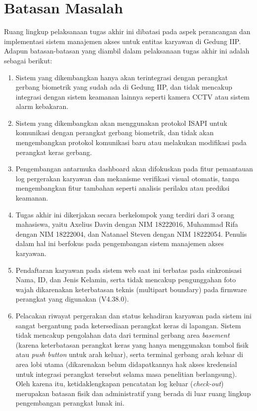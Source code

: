 \section{Batasan Masalah}
Ruang lingkup pelaksanaan tugas akhir ini dibatasi pada aspek perancangan dan implementasi sistem manajemen akses untuk entitas karyawan di Gedung IIP. Adapun batasan-batasan yang diambil dalam pelaksanaan tugas akhir ini adalah sebagai berikut:
\begin{enumerate}
    \item Sistem yang dikembangkan hanya akan terintegrasi dengan perangkat gerbang biometrik yang sudah ada di Gedung IIP, dan tidak mencakup integrasi dengan sistem keamanan lainnya seperti kamera CCTV atau sistem alarm kebakaran.
    \item Sistem yang dikembangkan akan menggunakan protokol ISAPI untuk komunikasi dengan perangkat gerbang biometrik, dan tidak akan mengembangkan protokol komunikasi baru atau melakukan modifikasi pada perangkat keras gerbang.
    \item Pengembangan antarmuka dashboard akan difokuskan pada fitur pemantauan log pergerakan karyawan dan mekanisme verifikasi visual otomatis, tanpa mengembangkan fitur tambahan seperti analisis perilaku atau prediksi keamanan.
    \item Tugas akhir ini dikerjakan secara berkelompok yang terdiri dari 3 orang mahasiswa, yaitu Axelius Davin dengan NIM 18222016, Muhammad Rifa dengan NIM 18222004, dan Natanael Steven dengan NIM 18222054. Penulis dalam hal ini berfokus pada pengembangan sistem manajemen akses karyawan.
    \item Pendaftaran karyawan pada sistem web saat ini terbatas pada sinkronisasi Nama, ID, dan Jenis Kelamin, serta tidak mencakup pengunggahan foto wajah dikarenakan keterbatasan teknis (multipart boundary) pada firmware perangkat yang digunakan (V4.38.0).
    \item Pelacakan riwayat pergerakan dan status kehadiran karyawan pada sistem ini sangat bergantung pada ketersediaan perangkat keras di lapangan. Sistem tidak mencakup pengolahan data dari terminal gerbang area \textit{basement} (karena keterbatasan perangkat keras yang hanya menggunakan tombol fisik atau \textit{push button} untuk arah keluar), serta terminal gerbang arah keluar di area lobi utama (dikarenakan belum didapatkannya hak akses kredensial untuk integrasi perangkat tersebut selama masa penelitian berlangsung). Oleh karena itu, ketidaklengkapan pencatatan log keluar (\textit{check-out}) merupakan batasan fisik dan administratif yang berada di luar ruang lingkup pengembangan perangkat lunak ini.
\end{enumerate}

